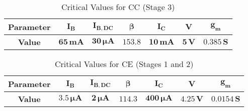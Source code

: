 \begin{table}[H]
\centering
\begin{tabular}{|c|c|c|c|c|c|c|}
\hline
\hline
\textbf{Parameter} & \(\mathbf{I_B}\) & \(\mathbf{I_{B, \text{DC}}}\) & \(\mathbf{\beta}\) & \(\mathbf{I_C}\) & \(\mathbf{V}\) & \(\mathbf{g_m}\) \\ \hline
\hline
\textbf{Value} & \(\mathbf{65 \, mA}\) & \(\mathbf{30 \, \mu A}\) & \(\mathbf{153.8}\) & \(\mathbf{10 \, mA}\) & \(\mathbf{5 \, V}\) & \(\mathbf{0.385 \, S}\) \\ \hline\hline
\end{tabular}
\caption{Critical Values for CC (Stage 3)}
\label{table:cc_values}
\end{table}

\begin{table}[H]
\centering
\begin{tabular}{|c|c|c|c|c|c|c|}
\hline
\hline
\textbf{Parameter} & \(\mathbf{I_B}\) & \(\mathbf{I_{B, \text{DC}}}\) & \(\mathbf{\beta}\) & \(\mathbf{I_C}\) & \(\mathbf{V}\) & \(\mathbf{g_m}\) \\ \hline\hline
\textbf{Value} & \(\mathbf{3.5 \, \mu A}\) & \(\mathbf{2 \, \mu A}\) & \(\mathbf{114.3}\) & \(\mathbf{400 \, \mu A}\) & \(\mathbf{4.25 \, V}\) & \(\mathbf{0.0154 \, S}\) \\ \hline\hline
\end{tabular}
\caption{Critical Values for CE (Stages 1 and 2)}
\label{table:ce_values}
\end{table}
